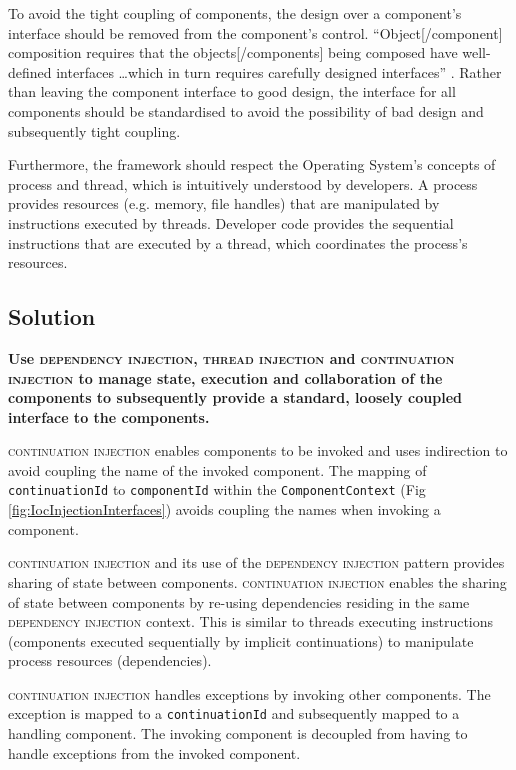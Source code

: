 \documentclass[prodmode]{style/acmlarge}
\begin{document}
To avoid the tight coupling of components, the design over a component's
interface should be removed from the component's control. ``Object[/component]
composition requires that the objects[/components] being composed have
well-defined interfaces \ldots which in turn requires carefully designed
interfaces'' \cite[p. 19]{gof}.  Rather than leaving the component interface to
good design, the interface for all components should be standardised to avoid
the possibility of bad design and subsequently tight coupling.

Furthermore, the framework should respect the Operating System's concepts of
process and thread, which is intuitively understood by developers.  A process
provides resources (e.g. memory, file handles) that are manipulated by
instructions executed by threads.  Developer code provides the sequential
instructions that are executed by a thread, which coordinates the process's
resources.


\subsection{Solution}

\textbf{Use \textsc{dependency injection}, \textsc{thread injection} and \textsc{continuation injection} to manage state, execution and collaboration of the components to subsequently provide a standard, loosely coupled interface to the components.}

\textsc{continuation injection} enables components to be invoked and uses
indirection to avoid coupling the name of the invoked component.  The mapping of
\texttt{continuationId} to \texttt{componentId} within the
\texttt{ComponentContext} (Fig \ref{fig:IocInjectionInterfaces}) avoids coupling
the names when invoking a component.

\textsc{continuation injection} and its use of the \textsc{dependency injection}
pattern \cite{ioc} provides sharing of state between components. 
\textsc{continuation injection} enables the sharing of state between components
by re-using dependencies residing in the same \textsc{dependency injection}
context.  This is similar to threads executing instructions (components executed
sequentially by implicit continuations) to manipulate process resources
(dependencies).

\textsc{continuation injection} handles exceptions by invoking other components.
The exception is mapped to a \texttt{continuationId} and subsequently mapped to
a handling component.  The invoking component is decoupled from having to handle
exceptions from the invoked component.
\end{document}
